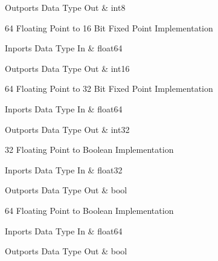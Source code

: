 \begin{XtoCtabular}{Outports Data Type}
Out & int8\tabularnewline
\hline
\end{XtoCtabular}

\ifdefined \AddTestReports
{}
\fi
{}
\nopagebreak[0]

64 Floating Point to 16 Bit Fixed Point Implementation

\begin{XtoCtabular}{Inports Data Type}
In & float64\tabularnewline
\hline
\end{XtoCtabular}

\begin{XtoCtabular}{Outports Data Type}
Out & int16\tabularnewline
\hline
\end{XtoCtabular}

\ifdefined \AddTestReports
{}
\fi
{}
\nopagebreak[0]

64 Floating Point to 32 Bit Fixed Point Implementation

\begin{XtoCtabular}{Inports Data Type}
In & float64\tabularnewline
\hline
\end{XtoCtabular}

\begin{XtoCtabular}{Outports Data Type}
Out & int32\tabularnewline
\hline
\end{XtoCtabular}

\ifdefined \AddTestReports
{}
\fi
{}
\nopagebreak[0]

32 Floating Point to Boolean Implementation

\begin{XtoCtabular}{Inports Data Type}
In & float32\tabularnewline
\hline
\end{XtoCtabular}

\begin{XtoCtabular}{Outports Data Type}
Out & bool\tabularnewline
\hline
\end{XtoCtabular}

\ifdefined \AddTestReports
{}
\fi
{}
\nopagebreak[0]

64 Floating Point to Boolean Implementation

\begin{XtoCtabular}{Inports Data Type}
In & float64\tabularnewline
\hline
\end{XtoCtabular}

\begin{XtoCtabular}{Outports Data Type}
Out & bool\tabularnewline
\hline
\end{XtoCtabular}

\ifdefined \AddTestReports
{}
\fi
